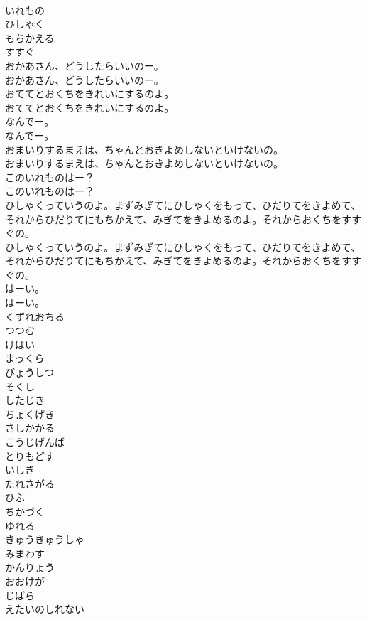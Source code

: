 \documentclass[8pt]{extreport}
\begin{document}
\begin{CJK}{UTF8}{min}
\\	いれもの
\\	ひしゃく
\\	もちかえる
\\	すすぐ
\\	おかあさん、どうしたらいいのー。
\\	おかあさん、どうしたらいいのー。
\\	おててとおくちをきれいにするのよ。
\\	おててとおくちをきれいにするのよ。
\\	なんでー。
\\	なんでー。
\\	おまいりするまえは、ちゃんとおきよめしないといけないの。
\\	おまいりするまえは、ちゃんとおきよめしないといけないの。
\\	このいれものはー？
\\	このいれものはー？
\\	ひしゃくっていうのよ。まずみぎてにひしゃくをもって、ひだりてをきよめて、それからひだりてにもちかえて、みぎてをきよめるのよ。それからおくちをすすぐの。
\\	ひしゃくっていうのよ。まずみぎてにひしゃくをもって、ひだりてをきよめて、それからひだりてにもちかえて、みぎてをきよめるのよ。それからおくちをすすぐの。
\\	はーい。
\\	はーい。
\\	くずれおちる
\\	つつむ
\\	けはい
\\	まっくら
\\	びょうしつ
\\	そくし
\\	したじき
\\	ちょくげき
\\	さしかかる
\\	こうじげんば
\\	とりもどす
\\	いしき
\\	たれさがる
\\	ひふ
\\	ちかづく
\\	ゆれる
\\	きゅうきゅうしゃ
\\	みまわす
\\	かんりょう
\\	おおけが
\\	じばら
\\	えたいのしれない

\end{CJK}
\end{document}
